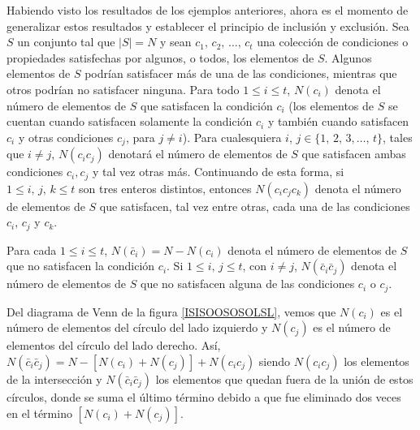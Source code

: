 \noindent
\begin{minipage}[l]{0.6\textwidth}
    \hspace*{6mm}Habiendo visto los resultados de los ejemplos anteriores, ahora es el momento de generalizar estos resultados y establecer el principio de inclusión y exclusión. Sea $S$ un conjunto tal que $|S|=N$ y sean $c_1, \, c_2, \, \dots, \, c_t$ una colección de condiciones o propiedades satisfechas por algunos, o todos, los elementos de $S$. Algunos elementos de $S$ podrían satisfacer más de una de las condiciones, mientras que otros podrían no satisfacer ninguna. Para todo $1 \leq i \leq t$, $N\left(c_i\right)$ denota el número de elementos de $S$ que satisfacen la condición $c_i$ (los elementos de $S$ se cuentan cuando satisfacen solamente la condición $c_i$ y también cuando satisfacen $c_i$ y otras condiciones $c_j$, para $j \neq i$). Para cualesquiera $i$, $j \in \{ 1, \, 2, \, 3, \dots, \, t\}$, tales que $i \neq j$, $N\left(c_i c_j\right)$ denotará el número de elementos de $S$ que satisfacen ambas condiciones $c_i, c_j$ y tal vez otras más. Continuando de esta forma, si $1 \leq i, \, j, \, k \leq t$ son tres enteros distintos, entonces $N\left(c_i c_j c_k\right)$ denota el número de elementos de $S$ que satisfacen, tal vez entre otras, cada una de las condiciones $c_i$, $c_j$ y $c_k$.
    
    \hspace*{6mm}Para cada $1 \leq i \leq t$, $N\left(\bar{c}_i\right)=N-N\left(c_i\right)$ denota el número de elementos de $S$ que no satisfacen la condición $c_i$. Si $1 \leq i, \, j \leq t$, con $i \neq j$, $N\left(\bar{c}_i \bar{c}_j\right)$ denota el número de elementos de $S$ que no satisfacen alguna de las condiciones $c_i$ o $c_j$.

    \hspace*{6mm}Del diagrama de Venn de la figura \ref{ISISOOSOSOLSL}, vemos que $N\left(c_i\right)$ es el número de elementos del círculo del lado izquierdo y $N\left(c_j\right)$ es el número de elementos del círculo del lado derecho. Así, $N(\bar{c}_i \bar{c}_j)=N - \left[N\left(c_i\right)+N\left(c_j\right)\right]+N\left(c_i c_j\right)$ siendo $N\left(c_i c_j\right)$ los elementos de la intersección y $N\left(\bar{c}_i \bar{c}_j\right)$ los elementos que quedan fuera de la unión de estos círculos, donde se suma el último término debido a que fue eliminado dos veces en el término $\left[N\left(c_i\right)+N\left(c_j\right)\right]$.
\end{minipage}~
